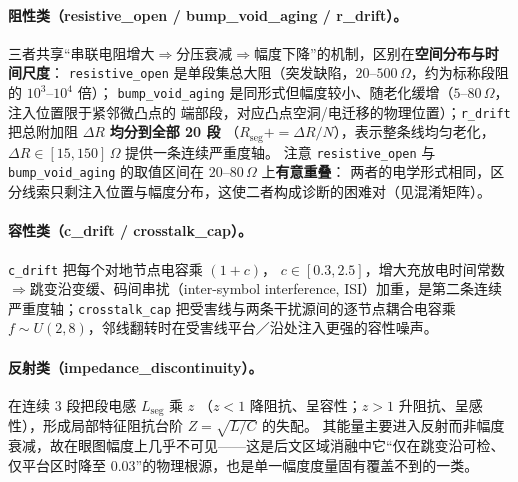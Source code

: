 \documentclass[11pt,a4paper,fontset=mac]{ctexart}
\begin{document}
\paragraph{阻性类（resistive\_open / bump\_void\_aging / r\_drift）。}
三者共享“串联电阻增大$\Rightarrow$分压衰减$\Rightarrow$幅度下降”的机制，区别在\textbf{空间分布与时间尺度}：
\texttt{resistive\_open} 是单段集总大阻（突发缺陷，$20$--$500\,\Omega$，约为标称段阻的 $10^3$--$10^4$ 倍）；
\texttt{bump\_void\_aging} 是同形式但幅度较小、随老化缓增（$5$--$80\,\Omega$，注入位置限于紧邻微凸点的
端部段，对应凸点空洞/电迁移的物理位置）；\texttt{r\_drift} 把总附加阻 $\Delta R$ \textbf{均分到全部 20 段}
（$R_\text{seg}\mathbin{+}{=}\Delta R/N$），表示整条线均匀老化，$\Delta R\in[15,150]\,\Omega$ 提供一条连续严重度轴。
注意 \texttt{resistive\_open} 与 \texttt{bump\_void\_aging} 的取值区间在 $20$--$80\,\Omega$ 上\textbf{有意重叠}：
两者的电学形式相同，区分线索只剩注入位置与幅度分布，这使二者构成诊断的困难对（见混淆矩阵）。

\paragraph{容性类（c\_drift / crosstalk\_cap）。} \texttt{c\_drift} 把每个对地节点电容乘 $(1{+}c)$，
$c\in[0.3,2.5]$，增大充放电时间常数$\Rightarrow$跳变沿变缓、码间串扰（inter-symbol interference,
ISI）加重，是第二条连续严重度轴；\texttt{crosstalk\_cap} 把受害线与两条干扰源间的逐节点耦合电容乘
$f\sim U(2,8)$，邻线翻转时在受害线平台／沿处注入更强的容性噪声。

\paragraph{反射类（impedance\_discontinuity）。} 在连续 3 段把段电感 $L_\text{seg}$ 乘 $z$
（$z{<}1$ 降阻抗、呈容性；$z{>}1$ 升阻抗、呈感性），形成局部特征阻抗台阶 $Z{=}\sqrt{L/C}$ 的失配。
其能量主要进入反射而非幅度衰减，故在眼图幅度上几乎不可见——这是后文区域消融中它“仅在跳变沿可检、
仅平台区时降至 0.03”的物理根源，也是单一幅度度量固有覆盖不到的一类。
\end{document}
